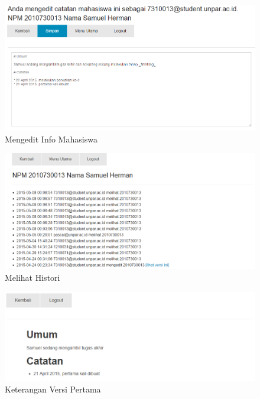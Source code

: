 \begin{figure}[H]
\centering
\includegraphics[scale=0.44]{Gambar/pengujian10.png}
\caption[Mengedit Info Mahasiswa]{Mengedit Info Mahasiswa} 
\label{fig:mengeditinfomahasiswa}
\end{figure}

\begin{figure}[H]
\centering
\includegraphics[scale=0.44]{Gambar/pengujian11.png}
\caption[Melihat Histori]{Melihat Histori} 
\label{fig:melihathistori}
\end{figure}

\begin{figure}[H]
\centering
\includegraphics[scale=0.44]{Gambar/pengujian12.png}
\caption[Keterangan Versi Pertama]{Keterangan Versi Pertama} 
\label{fig:keteranganversipertama}
\end{figure}

